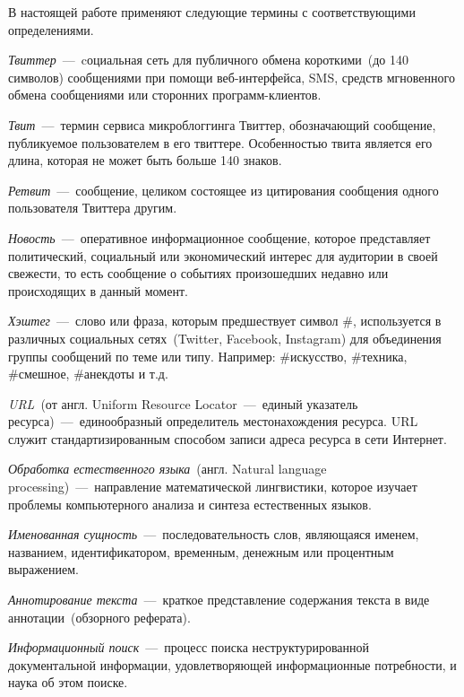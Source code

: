 \vocabularytitle
    В настоящей работе применяют следующие термины с соответствующими определениями.

    \textit{Твиттер}~---~cоциальная сеть для публичного обмена короткими~(до 140 символов) сообщениями при помощи веб-интерфейса, SMS,
    средств мгновенного обмена сообщениями или сторонних программ-клиентов.

    \textit{Твит}~---~термин сервиса микроблоггинга Твиттер, обозначающий сообщение, публикуемое пользователем в его твиттере.
    Особенностью твита является его длина, которая не может быть больше 140 знаков.

    \textit{Ретвит}~---~сообщение, целиком состоящее из цитирования сообщения одного пользователя Твиттера другим.

    \textit{Новость}~---~оперативное информационное сообщение, которое представляет политический, социальный или экономический интерес для аудитории в своей свежести,
    то есть сообщение о событиях произошедших недавно или происходящих в данный момент.

    \textit{Хэштег}~---~слово или фраза, которым предшествует символ \#, используется в различных социальных сетях~(Twitter, Facebook, Instagram)
    для объединения группы сообщений по теме или типу.
    Например: \#искусство, \#техника, \#смешное, \#анекдоты и т.д.

    \textit{URL}~(от англ. Uniform Resource Locator~---~единый указатель ресурса)~---~единообразный определитель местонахождения ресурса.
    URL служит стандартизированным способом записи адреса ресурса в сети Интернет.

    \textit{Обработка естественного языка}~(англ. Natural language processing)~---~направление математической лингвистики,
    которое изучает проблемы компьютерного анализа и синтеза естественных языков.

    \textit{Именованная сущность}~---~последовательность слов, являющаяся именем, названием, идентификатором, временным, денежным или процентным выражением.

    \textit{Аннотирование текста}~---~краткое представление содержания текста в виде аннотации~(обзорного реферата).

    \textit{Информационный поиск}~---~процесс поиска неструктурированной документальной информации, удовлетворяющей информационные потребности, и наука об этом поиске.

